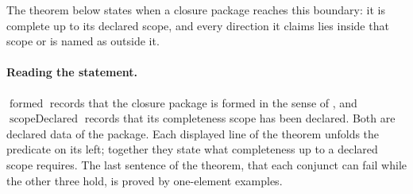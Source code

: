 The theorem below states when a closure package reaches this boundary:
it is complete up to its declared scope, and every direction it claims
lies inside that scope or is named as outside it.

\paragraph{Reading the statement.}
\(\operatorname{formed}\) records that the closure package is formed in
the sense of , and
\(\operatorname{scopeDeclared}\) records that its completeness scope has
been declared. Both are declared data of the package. Each displayed
line of the theorem unfolds the predicate on its left; together they
state what completeness up to a declared scope requires. The last sentence of the theorem, that each conjunct can fail while the other three hold, is proved by one-element examples.

